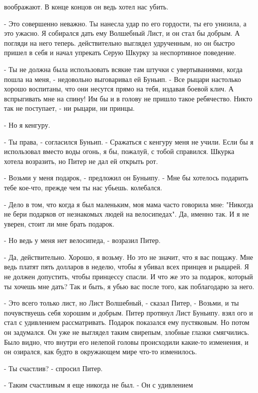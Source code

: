 воображают. В конце концов он ведь хотел нас убить.
\par- Это совершенно неважно. Ты нанесла удар по его гордости, ты его 
унизила, а это ужасно. Я собирался дать ему Волшебный Лист, и он стал 
бы добрым. А погляди на него теперь.
 действительно выглядел удрученным, но он быстро пришел в 
себя и начал упрекать Серую Шкурку за неспортивное поведение.
\par- Ты не должна была использовать всякие там штучки с 
увертываниями, когда пошла на меня, - недовольно выговаривал ей 
Буньип. - Все рыцари настолько хорошо воспитаны, что они несутся прямо 
на тебя, издавая боевой клич. А вспрыгивать мне на спину! Им бы и в 
голову не пришло такое ребячество. Никто так не поступает, - ни 
рыцари, ни принцы.
\par- Но я кенгуру.
\par- Ты права, - согласился Буньип. - Сражаться с кенгуру меня не 
учили. Если бы я использовал вместо воды огонь, я бы, пожалуй, с тобой 
справился.
 Шкурка хотела возразить, но Питер не дал ей открыть рот.
\par- Возьми у меня подарок, - предложил он Буньипу. - Мне бы хотелось 
подарить тебе кое-что, прежде чем ты нас убьешь.
 колебался.
\par- Дело в том, что когда я был маленьким, моя мама часто говорила 
мне: "Никогда не бери подарков от незнакомых людей на велосипедах". 
Да, именно так. И я не уверен, стоит ли мне брать подарок.
\par- Но ведь у меня нет велосипеда, - возразил Питер.
\par- Да, действительно. Хорошо, я возьму. Но это не значит, что я вас 
пощажу. Мне ведь платят пять долларов в неделю, чтобы я убивал всех 
принцев и рыцарей. Я не должен допустить, чтобы принцессу спасли. И 
что же это за подарок, который ты хочешь мне дать? Так и быть, я убью 
вас после того, как поблагодарю за него.
\par- Это всего только лист, но Лист Волшебный, - сказал Питер, - 
Возьми, и ты почувствуешь себя хорошим и добрым.
 Питер протянул Лист Буньипу.
 взял ого и стал с удивлением рассматривать. Подарок показался 
ему пустяковым. Но потом он задумался. Он уже не выглядел таким 
свирепым, злобные глазки смягчились. Было видно, что внутри его 
нелепой головы происходили какие-то изменения, и он озирался, как 
будто в окружающем мире что-то изменилось.
\par- Ты счастлив? - спросил Питер.
\par- Таким счастливым я еще никогда не был. - Он с удивлением 
